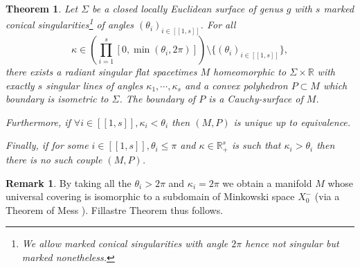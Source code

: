 \documentclass[a4paper,12pt]{article}
\def\lsem{[\![}
\def\rsem{]\!]}
\def\RR{\mathbb{R}}
\newtheorem*{theon}{Theorem}
\theoremstyle{definition}
\newtheorem*{rem}{Remark}			 %
\begin{document}
	 \begin{theon} Let $\Sigma$ be a closed locally Euclidean surface of genus $g$ with $s$ marked conical singularities\footnote{We allow marked conical singularities with angle $2\pi$ hence not singular but marked nonetheless.}  of angles $(\theta_i)_{i\in \lsem 1,s\rsem}$.
For all $$\kappa\in \left(\prod_{i=1}^s[0,\min(\theta_i,2\pi)]\right) \setminus \{(\theta_i)_{i\in \lsem 1,s\rsem}\},$$ there exists a radiant singular flat spacetimes $M$ homeomorphic to $\Sigma\times \RR$ with exactly $s$ singular lines of angles $\kappa_1,\cdots,\kappa_s$ and
a convex polyhedron $P\subset M$ which boundary is isometric to $\Sigma$. The boundary of $P$ is a Cauchy-surface of $M$.
	
	Furthermore, if $\forall i\in\lsem 1,s\rsem,\kappa_i<\theta_i$ then $(M,P)$ is unique up to equivalence.
				
	Finally, if for some $i\in\lsem 1,s\rsem,\theta_i\leq \pi$ and $\kappa\in \RR_+^s$ is such that $\kappa_i>\theta_i$ then there is no such couple $(M,P)$.
	\end{theon}
	\begin{rem}
	By taking all the $\theta_i>2\pi$ and $\kappa_i=2\pi$ we obtain a manifold $M$ whose universal covering is isomorphic to a subdomain of Minkowski space $X_{0}^-$ (via a Theorem of Mess \cite{mess}). Fillastre Theorem thus follows.
	\end{rem}


	
	
	
\end{document}
